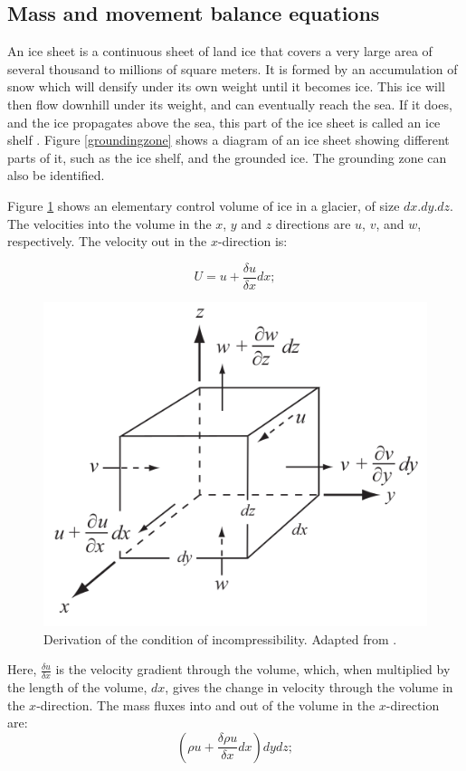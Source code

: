 \documentclass{article}
\begin{document}
\label{glacier_dynamics}
\subsection{Mass and movement balance equations}
An ice sheet is a continuous sheet of land ice that covers a very large area of several thousand to millions of square meters. It is formed by an accumulation of snow which will densify under its own weight until it becomes ice. This ice will then flow downhill under its weight, and can eventually reach the sea. If it does, and the ice propagates above the sea, this part of the ice sheet is called an ice shelf \cite[]{hutter1982mathematical}. Figure \ref{groundingzone} shows a diagram of an ice sheet showing different parts of it, such as the ice shelf, and the grounded ice. The grounding zone can also be identified. 

Figure \ref{control_volume} shows an elementary control volume of ice in a glacier, of size $dx.dy.dz$. The velocities into the volume in the $x$, $y$ and $z$ directions are $u$, $v$, and $w$, respectively. The velocity out in the $x$-direction is:

\begin{equation}
	U = u+\frac{\delta u}{\delta x}dx;
\end{equation}

\begin{figure}[!h]
	\centering
	\includegraphics[width=0.5\linewidth]{../fig/Control_volume.png}
	\caption{Derivation of the condition of incompressibility. Adapted from \cite{hooke2019principles}.}
	\label{control_volume}
\end{figure}

Here, $\frac{\delta u}{\delta x}$ is the velocity gradient through the volume, which, when multiplied by the length of the volume, $dx$, gives the change in velocity through the volume in the $x$-direction. The mass fluxes into and out of the volume in the $x$-direction are:
\begin{equation}
	({\rho u + \frac{\delta \rho u}{\delta x}dx})dy dz;
\end{equation}
\end{document}
